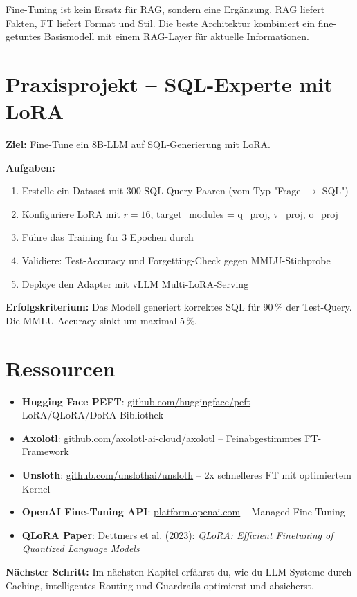\begin{merke}
Fine-Tuning ist kein Ersatz für RAG, sondern eine Ergänzung. RAG liefert Fakten, FT liefert Format und Stil. Die beste Architektur kombiniert ein fine-getuntes Basismodell mit einem RAG-Layer für aktuelle Informationen.
\end{merke}

\section{Praxisprojekt -- SQL-Experte mit LoRA}

\textbf{Ziel:} Fine-Tune ein 8B-LLM auf SQL-Generierung mit LoRA.

\textbf{Aufgaben:}
\begin{enumerate}[leftmargin=*]
    \item Erstelle ein Dataset mit 300 SQL-Query-Paaren (vom Typ "Frage $\rightarrow$ SQL")
    \item Konfiguriere LoRA mit $r=16$, target\_modules = q\_proj, v\_proj, o\_proj
    \item Führe das Training für 3 Epochen durch
    \item Validiere: Test-Accuracy und Forgetting-Check gegen MMLU-Stichprobe
    \item Deploye den Adapter mit vLLM Multi-LoRA-Serving
\end{enumerate}

\textbf{Erfolgskriterium:} Das Modell generiert korrektes SQL für 90\,\% der Test-Query. Die MMLU-Accuracy sinkt um maximal 5\,\%.

\section{Ressourcen}

\begin{itemize}[leftmargin=*]
    \item \textbf{Hugging Face PEFT}: \href{https://github.com/huggingface/peft}{github.com/huggingface/peft} -- LoRA/QLoRA/DoRA Bibliothek
    \item \textbf{Axolotl}: \href{https://github.com/axolotl-ai-cloud/axolotl}{github.com/axolotl-ai-cloud/axolotl} -- Feinabgestimmtes FT-Framework
    \item \textbf{Unsloth}: \href{https://github.com/unslothai/unsloth}{github.com/unslothai/unsloth} -- 2x schnelleres FT mit optimiertem Kernel
    \item \textbf{OpenAI Fine-Tuning API}: \href{https://platform.openai.com/docs/guides/fine-tuning}{platform.openai.com} -- Managed Fine-Tuning
    \item \textbf{QLoRA Paper}: Dettmers et al. (2023): \textit{QLoRA: Efficient Finetuning of Quantized Language Models}
\end{itemize}

\textbf{Nächster Schritt:} Im nächsten Kapitel erfährst du, wie du LLM-Systeme durch Caching, intelligentes Routing und Guardrails optimierst und absicherst.
